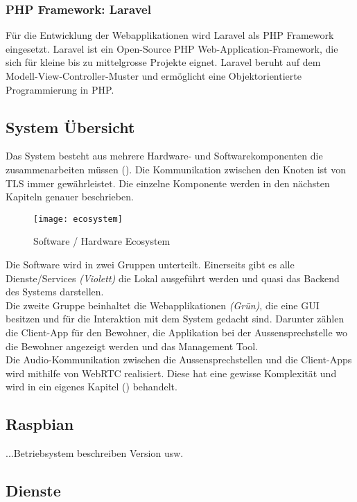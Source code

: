 \subsubsection{PHP Framework: Laravel}
Für die Entwicklung der Webapplikationen wird Laravel als PHP Framework eingesetzt. Laravel ist ein Open-Source PHP Web-Application-Framework, die sich für kleine bis zu mittelgrosse Projekte eignet. Laravel beruht auf dem Modell-View-Controller-Muster und ermöglicht eine Objektorientierte Programmierung in PHP.

\subsection{System Übersicht}
Das System besteht aus mehrere Hardware- und Softwarekomponenten die zusammenarbeiten müssen (). Die Kommunikation zwischen den Knoten ist von TLS immer gewährleistet. Die einzelne Komponente werden in den nächsten Kapiteln genauer beschrieben.

\begin{figure}[htb!]
	\begin{center}
		\texttt{[image: ecosystem]}
		\caption[Software / Hardware Ecosystem]{Software / Hardware Ecosystem}
		\label{fig:echosystem}
	\end{center}
\end{figure}

Die Software wird in zwei Gruppen unterteilt. Einerseits gibt es alle Dienste/Services \textit{(Violett)} die Lokal ausgeführt werden und quasi das Backend des Systems darstellen.
\\
Die zweite Gruppe beinhaltet die Webapplikationen \textit{(Grün)}, die eine GUI besitzen und für die Interaktion mit dem System gedacht sind. Darunter zählen die Client-App für den Bewohner, die Applikation bei der Aussensprechstelle wo die Bewohner angezeigt werden und das Management Tool.
\\
Die Audio-Kommunikation zwischen die Aussensprechstellen und die Client-Apps wird mithilfe von WebRTC realisiert. Diese hat eine gewisse Komplexität und wird in ein eigenes Kapitel () behandelt.

\subsection{Raspbian}
\label{kap:raspbian}
...Betriebsystem beschreiben Version usw.

\subsection{Dienste}
\label{kap:dienste}


